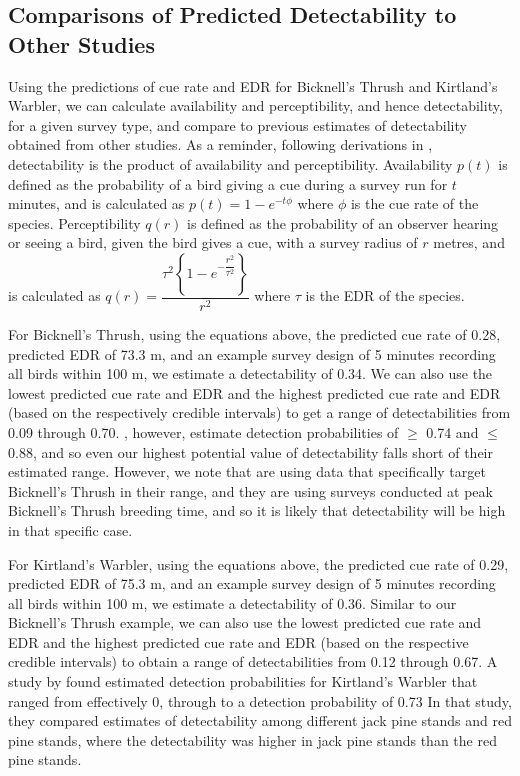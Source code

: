\documentclass[12pt]{article}
\begin{document}
\subsection{Comparisons of Predicted Detectability to Other Studies}

\par Using the predictions of cue rate and EDR for Bicknell’s Thrush and Kirtland’s Warbler, we can calculate availability and perceptibility, and hence detectability, for a given survey type, and compare to previous estimates of detectability obtained from other studies.
As a reminder, following derivations in \citet{solymos_calibrating_2013}, detectability is the product of availability and perceptibility.
Availability $p(t)$ is defined as the probability of a bird giving a cue during a survey run for $t$ minutes, and is calculated as
$p(t) = 1 - e^{-t\phi}$
where $\phi$ is the cue rate of the species.
Perceptibility $q(r)$ is defined as the probability of an observer hearing or seeing a bird, given the bird gives a cue, with a survey radius of $r$ metres, and is calculated as
$q(r) = \dfrac{\tau^2 \left\{1 - e^{-\dfrac{r^2}{\tau^2}}\right\}}{r^2}$
where $\tau$ is the EDR of the species.

\par For Bicknell's Thrush, using the equations above, the predicted cue rate of 0.28, predicted EDR of 73.3 m, and an example survey design of 5 minutes recording all birds within 100 m, we estimate a detectability of 0.34.
We can also use the lowest predicted cue rate and EDR and the highest predicted cue rate and EDR (based on the respectively credible intervals) to get a range of detectabilities from 0.09 through 0.70.
\citet{aubry_bicknells_2018}, however, estimate detection probabilities of $\geq$ 0.74 and $\leq$ 0.88, and so even our highest potential value of detectability falls short of their estimated range.
However, we note that \citet{aubry_bicknells_2018} are using data that specifically target Bicknell's Thrush in their range, and they are using surveys conducted at peak Bicknell's Thrush breeding time, and so it is likely that detectability will be high in that specific case.

\par For Kirtland's Warbler, using the equations above, the predicted cue rate of 0.29, predicted EDR of 75.3 m, and an example survey design of 5 minutes recording all birds within 100 m, we estimate a detectability of 0.36.
Similar to our Bicknell's Thrush example, we can also use the lowest predicted cue rate and EDR and the highest predicted cue rate and EDR (based on the respective credible intervals) to obtain a range of detectabilities from 0.12 through 0.67.
A study by \citet{van_dyke_comparative_2022} found estimated detection probabilities for Kirtland’s Warbler that ranged from effectively 0, through to a detection probability of 0.73
In that study, they compared estimates of detectability among different jack pine stands and red pine stands, where the detectability was higher in jack pine stands than the red pine stands.
\end{document}
